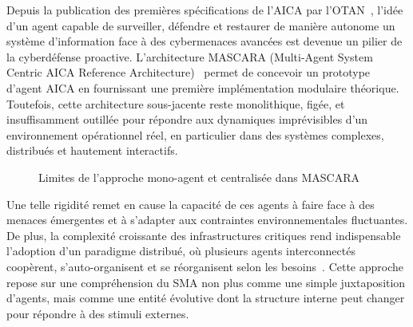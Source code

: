 \documentclass[ twoside,openright,titlepage,numbers=noenddot,headinclude,%
                footinclude=true,cleardoublepage=empty,abstractoff, %
                BCOR=5mm,paper=a4,fontsize=11pt,%
                french,american,%
                ]{scrreprt}
\begin{document}

Depuis la publication des premières spécifications de l'AICA par l'OTAN~\cite{Kott2018}, l'idée d'un agent capable de surveiller, défendre et restaurer de manière autonome un système d'information face à des cybermenaces avancées est devenue un pilier de la cyberdéfense proactive. L'architecture MASCARA (Multi-Agent System Centric AICA Reference Architecture)~\cite{Kott2023} permet de concevoir un prototype d'agent AICA en fournissant une première implémentation modulaire théorique. Toutefois, cette architecture sous-jacente reste monolithique, figée, et insuffisamment outillée pour répondre aux dynamiques imprévisibles d'un environnement opérationnel réel, en particulier dans des systèmes complexes, distribués et hautement interactifs.

\begin{figure}[h]
    \centering
    \caption{Limites de l'approche mono-agent et centralisée dans MASCARA}
    \label{fig:mascara-limit}
\end{figure}

Une telle rigidité remet en cause la capacité de ces agents à faire face à des menaces émergentes et à s'adapter aux contraintes environnementales fluctuantes. De plus, la complexité croissante des infrastructures critiques rend indispensable l'adoption d'un paradigme distribué, où plusieurs agents interconnectés coopèrent, s'auto-organisent et se réorganisent selon les besoins~\cite{Ferber1999, Gleizes2008}. Cette approche repose sur une compréhension du SMA non plus comme une simple juxtaposition d'agents, mais comme une entité évolutive dont la structure interne peut changer pour répondre à des stimuli externes.
\end{document}
